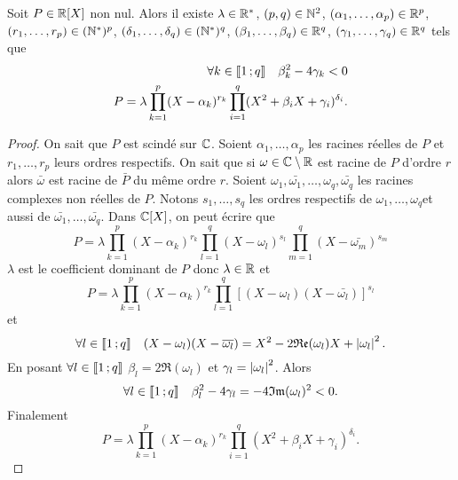 \begin{theo}
  Soit $P \in \mathbb{R}[X]$ non nul. Alors il existe $\lambda \in \mathbb{R}^*$, $(p,q) \in \mathbb{N}^2$, $(\alpha_1, \ldots, \alpha_p) \in \mathbb{R}^p$, $(r_1, \ldots, r_p) \in (\mathbb{N}^*)^p$, $(\delta_1, \ldots, \delta_q) \in (\mathbb{N}^*)^q$, $(\beta_1, \ldots, \beta_q) \in \mathbb{R}^q$, $(\gamma_1, \ldots, \gamma_q) \in \mathbb{R}^q$ tels que
  \begin{align}
    \forall k \in \mathopen{\llbracket}1\mathclose{}\mathpunct{};q\mathclose{\rrbracket} \quad \beta_k^2 - 4\gamma_k <0\\
    P = \lambda \prod_{k=1}^p (X-\alpha_k)^{r_k} \prod_{i=1}^q(X^2+\beta_i X+\gamma_i)^{\delta_i}.
  \end{align}
\end{theo}
\begin{proof}
  On sait que $P$ est scindé sur $\mathbb{C}$. Soient $\alpha_1, \ldots, \alpha_p$ les racines réelles de $P$ et $r_1, \ldots, r_p$ leurs ordres respectifs. On sait que si $\omega \in \mathbb{C}\setminus\mathbb{R}$ est racine de $P$ d'ordre $r$ alors $\bar{\omega}$ est racine de $\bar{P}$ du même ordre $r$.
  Soient $\omega_1, \bar{\omega_1}, \ldots, \omega_q, \bar{\omega_q}$ les racines complexes non réelles de $P$. 
  Notons $s_1, \ldots, s_q$ les ordres respectifs de $\omega_1, \ldots, \omega_q$et aussi de $\bar{\omega_1}, \ldots, \bar{\omega_q}$. Dans $\mathbb{C}[X]$, on peut écrire que
  \begin{equation}
    P=\lambda \prod_{k=1}^p (X-\alpha_k)^{r_k} \prod_{l=1}^q (X-\omega_l)^{s_l} \prod_{m=1}^q (X-\bar{\omega_m})^{s_m}
  \end{equation}
  $\lambda$ est le coefficient dominant de $P$ donc $\lambda \in \mathbb{R}$ et
  \begin{equation}
    P = \lambda \prod_{k=1}^p (X-\alpha_k)^{r_k} \prod_{l=1}^q [(X-\omega_l)(X-\bar{\omega_l})]^{s_l}
  \end{equation}
  et 
  \begin{equation}
    \forall l \in \mathopen{\llbracket}1\mathclose{}\mathpunct{};q\mathclose{\rrbracket} \quad (X-\omega_l)(X-\overline{\omega_l}) = X^2 -2\mathfrak{Re}(\omega_l)X + \left\lvert\omega_l\right\rvert^2.
  \end{equation}
  En posant $\forall l \in \mathopen{\llbracket}1\mathclose{}\mathpunct{};q\mathclose{\rrbracket}$ $\beta_l = 2\Re(\omega_l)$ et $\gamma_l = \left\lvert\omega_l\right\rvert^2$. Alors
  \begin{equation}
    \forall l \in \mathopen{\llbracket}1\mathclose{}\mathpunct{};q\mathclose{\rrbracket} \quad \beta_l^2 -4\gamma_l = -4\mathfrak{Im}(\omega_l)^2 < 0.
  \end{equation}
  Finalement
  \begin{equation}
    P = \lambda \prod_{k=1}^p (X-\alpha_k)^{r_k} \prod_{i=1}^q(X^2+\beta_i X+\gamma_i)^{\delta_i}.
  \end{equation}
\end{proof}

